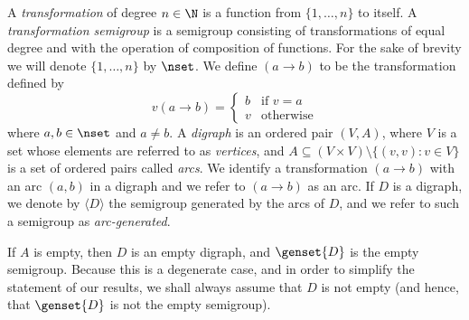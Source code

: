 A \emph{transformation} of degree $n\in \N$ is a function from $\{1, \ldots,
n\}$ to itself. A \emph{transformation semigroup} is a semigroup consisting
of transformations of equal degree and with the operation of composition of
functions. For the sake of brevity we will denote $\{1,\ldots,n\}$ by $\nset$.
We define $(a \to b)$ to be the transformation defined by
\begin{equation*} 
v (a \to b) = 
 \begin{cases}
 b & \text{if } v = a\\
 v & \text{otherwise}
 \end{cases} 
\end{equation*}
where $a, b \in \nset$ and $a \ne b$. A \emph{digraph} is an ordered pair
$(V, A)$, where $V$ is a set whose elements are referred to as
\emph{vertices}, and $A\subseteq (V\times V) \setminus \{(v,v) : v \in V\}$
is a set of ordered pairs called
\emph{arcs}. We identify a transformation $(a \to b)$ with an arc $(a, b)$
in a digraph and we refer to $(a \to b)$ as an arc. If $D$ is a digraph,
we denote by $\langle D \rangle$ the semigroup generated by
the arcs of $D$, and we refer to such a semigroup as \emph{arc-generated}.

If $A$ is empty, then $D$ is an empty digraph, and $\genset{D}$ is the empty
semigroup. Because this is a degenerate case, and in order to simplify the
statement of our results, we shall always assume that $D$ is not empty (and
hence, that $\genset{D}$ is not the empty semigroup). 
